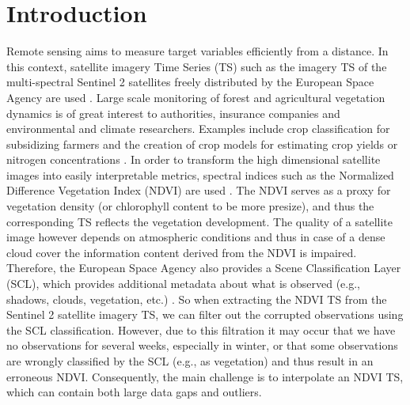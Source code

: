 \chapter{Introduction}

Remote sensing aims to measure target variables efficiently from a distance. In this context, satellite imagery Time Series ({TS}) such as the imagery {TS} of the multi-spectral Sentinel 2 satellites freely distributed by the European Space Agency are used \citep{esaSentinel22022}.
Large scale monitoring of forest and agricultural vegetation dynamics is of great interest to authorities, insurance companies and environmental and climate researchers. Examples include crop classification for subsidizing farmers \citep{henitsSentinel2EnablesNationwide2022} and the creation of crop models for estimating crop yields or nitrogen concentrations \citep{couraultSTICSCropModel2021,perichCropNitrogenRetrieval2021}. 
In order to transform the high dimensional satellite images into easily interpretable metrics, spectral indices such as the Normalized Difference Vegetation Index (NDVI) are used \citep{rouseMonitoringVernalAdvancement1974}. The NDVI serves as a proxy for vegetation density (or chlorophyll content to be more presize), and thus the corresponding {TS} reflects the vegetation development. 
The quality of a satellite image however depends on atmospheric conditions and thus in case of a dense cloud cover the information content derived from the NDVI is impaired. Therefore, the European Space Agency also provides a Scene Classification Layer (SCL), which provides additional metadata about what is observed (e.g., shadows, clouds, vegetation, etc.) \citep{esaLevel2AAlgorithmOverview2022}. So when extracting the NDVI {TS} from the Sentinel 2 satellite imagery {TS}, we can filter out the corrupted observations using the SCL classification. However, due to this filtration it may occur that we have no observations for several weeks, especially in winter, or that some observations are wrongly classified by the SCL (e.g., as vegetation) and thus result in an erroneous NDVI. Consequently, the main challenge is to interpolate an NDVI {TS}, which can contain both large data gaps and outliers. 

